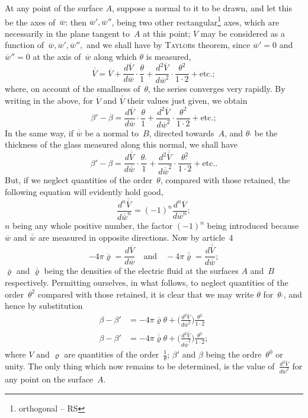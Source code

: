 \documentclass[11pt,notitlepage]{amsart}
\let\Person\textsc
\renewcommand{\rho}{\varrho}
\begin{document}
At any point of the surface $A$, suppose a normal to it to be drawn,
and let this be the axes of~$\overline{w}$:
then $\overline{w}',\overline{w}''$,
being two other rectangular\footnote{orthogonal -- RS} axes,
which are necessarily in the plane tangent to~$A$ at this point; $V$ may be
considered as a function of~$\overline{w},\overline{w}',\overline{w}'',$
and we shall have by \Person{Taylor}s
theorem, since $\overline{w}'=0$ and
$\overline{w}''=0$ at the axis of~$\overline{w}$
along which $\theta$ is measured,
\[
\overline{\overline{V}}=\overline{V}
+\frac{d\overline{V}}{d\overline{w}}\cdot\frac\theta1
+\frac{d^2\overline{V}}{d\overline{w}^2}\cdot\frac{\theta^2}{1\cdot2}
+\text{etc.};
\]
where, on account of the smallness of~$\theta$,
the series converges very rapidly.
By writing in the above, for $\overline{V}$ and
$\overline{\overline{V}}$ their values just given, we obtain
\[
\beta'-\beta=
\frac{d\overline{V}}{d\overline{w}}\cdot\frac\theta1
+\frac{d^2\overline{V}}{d\overline{w}^2}\cdot\frac{\theta^2}{1\cdot2}
+\text{etc.};
\]
In the same way, if $\overline{\overline{w}}$ be a normal to~$B$,
directed towards~$A$, and $\theta_\prime$ be the
thickness of the glass measured along this normal, we shall have
\[
\beta'-\beta=
\frac{d\overline{\overline{V}}}{d\overline{\overline{w}}}
\cdot\frac{\theta_\prime}{1}
+\frac{d^2\overline{\overline{V}}}{d\overline{\overline{w}}^2}
\cdot\frac{\theta_\prime^2}{1\cdot2}
+\text{etc.}.
\]
But, if we neglect quantities of the order~$\theta$,
compared with those retained,
the following equation will evidently hold good,
\[
\frac{d^n\overline{\overline{V}}}{d\overline{\overline{w}}^n}
=(-1)^n\frac{d^n\overline{V}}{d\overline{w}^n};
\]
$n$ being any whole positive number,
the factor $(-1)^n$ being introduced because
$\overline{w}$ and $\overline{\overline{w}}$
are measured in opposite directions. Now by article~4
\[
-4\pi\overline{\rho}=
\frac{d\overline{V}}{d\overline{w}}
\quad\text{and}\quad
-4\pi\overline{\overline{\rho}}=
\frac{d\overline{\overline{V}}}{d\overline{\overline{w}}};
\]
$\overline\rho$ and $\overline{\overline\rho}$
being the densities of the electric fluid at the
surfaces $A$ and~$B$ respectively.
Permitting ourselves, in what follows, to neglect quantities of the
order~$\theta^2$ compared with those retained,
it is clear that we may write $\theta$ for~$\theta_\prime$,
and hence by substitution
\[
\begin{aligned}
\beta-\beta' &=
-4\pi\overline{\rho}\theta+
\biggl(\frac{d^2\overline{V}}{d\overline{w}^2}\biggr)
\frac{\theta^2}{1\cdot2}\\
\beta-\beta' &=
-4\pi\overline{\overline{\rho}}\theta+
\biggl(\frac{d^2\overline{\overline{V}}}{d\overline{\overline{w}}^2}\biggr)
\frac{\theta^2}{1\cdot2};
\end{aligned}
\]
where $V$ and $\rho$ are quantities of the order~$\frac1\theta$;
$\beta'$ and $\beta$ being the ordre~$\theta^0$
or unity. The only thing which now remains to be determined, is the value
of~$\frac{d^2\overline{V}}{d\overline{w}^2}$
for any point on the surface~$A$.
\end{document}
